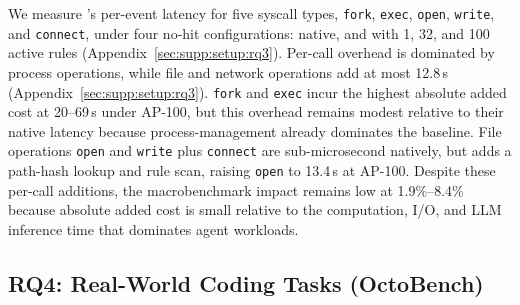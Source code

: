 We measure \sys{}'s per-event latency for five syscall types, \texttt{fork}, \texttt{exec}, \texttt{open}, \texttt{write}, and \texttt{connect}, under four no-hit configurations: native, and \sys{} with 1, 32, and 100 active rules (Appendix~\ref{sec:supp:setup:rq3}).
Per-call overhead is dominated by process operations, while file and network operations add at most 12.8\,\textmu s (Appendix~\ref{sec:supp:setup:rq3}).
\texttt{fork} and \texttt{exec} incur the highest absolute added cost at 20--69\,\textmu s under AP-100, but this overhead remains modest relative to their native latency because process-management already dominates the baseline.
File operations \texttt{open} and \texttt{write} plus \texttt{connect} are sub-microsecond natively, but \sys{} adds a path-hash lookup and rule scan, raising \texttt{open} to 13.4\,\textmu s at AP-100.
Despite these per-call additions, the macrobenchmark impact remains low at 1.9\%--8.4\% because absolute added cost is small relative to the computation, I/O, and LLM inference time that dominates agent workloads.

\subsection{RQ4: Real-World Coding Tasks (OctoBench)}
\label{sec:eval:rq4}

